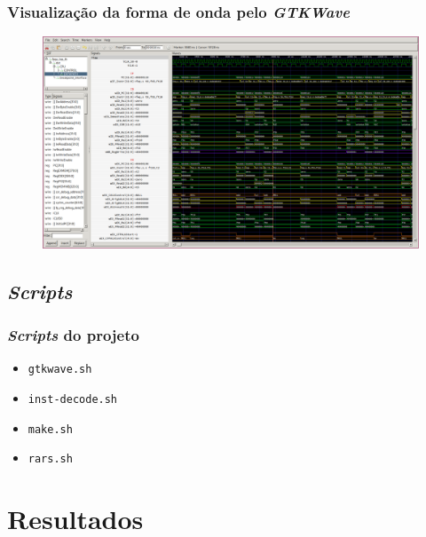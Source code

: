 \documentclass[aspectratio=169]{beamer}
\begin{document}
    \begin{frame}
        \frametitle{Visualização da forma de onda pelo \textit{GTKWave}}
        \vfill
        \begin{figure}[H]
        \centering
            \includegraphics[width=.9\textwidth,height=.85\textheight,keepaspectratio]{../images/gtkwave/random.png}
        \end{figure}
        \vfill
    \end{frame}

    \subsection{\textit{Scripts}}
    \begin{frame}
        \frametitle{\textit{Scripts} do projeto}
        \vfill
        \begin{itemize}
            \item \texttt{gtkwave.sh}
            \item \texttt{inst-decode.sh}
            \item \texttt{make.sh}
            \item \texttt{rars.sh}
        \end{itemize}
        \vfill
    \end{frame}

\section{Resultados}
\end{document}
